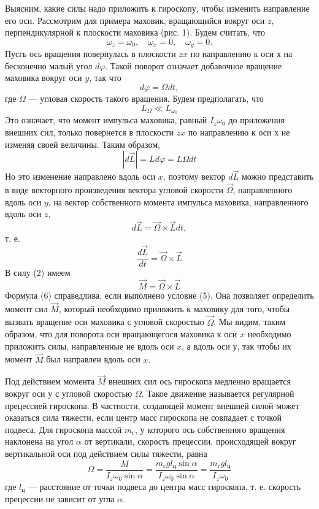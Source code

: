 \documentclass[a4paper,12pt]{article} %
\begin{document}
Выясним, какие силы надо приложить к гироскопу, чтобы изменить направление его оси. Рассмотрим для примера маховик, вращающийся вокруг оси $z$, перпендикулярной к плоскости маховика (рис. 1). Будем считать, что
\[\omega_z = \omega_0, \quad \omega_x = 0, \quad \omega_y = 0.\]
Пусгь ось вращения повернулась в плоскости $zx$ по направлению к оси $х$ на бесконечно малый угол $d\varphi$. Такой поворот означает добавочное вращение маховика вокруг оси $y$, так что
\[d\varphi = \Omega dt,\]
где $\Omega$ — угловая скорость такого вращения. Будем предполагать, что
\begin{equation}
L_\Omega \ll L_{\omega_0}
\end{equation}
Это означает, что момент импульса маховика, равный $I_z\omega_0$ до приложения внешних сил, только повернется в плоскости $zx$ по направлению к оси $х$ не изменяя своей величины. Таким образом,
\[|d\overrightarrow{L}| = Ld\varphi = L\Omega dt\]
Но это изменение направлено вдоль оси $x$, поэтому вектор $d\overrightarrow{L}$ можно представить в виде векторного произведения вектора угловой скорости $\overrightarrow{\Omega}$, направленного вдоль оси $y$, на вектор собственного момента импульса маховика, направленного вдоль оси $z$,
\[d\overrightarrow{L} = \overrightarrow{\Omega} \times \overrightarrow{L}dt,\]
т. е.
\[\frac{d\overrightarrow{L}}{dt} = \overrightarrow{\Omega} \times \overrightarrow{L}\]
В силу (2) имеем
\begin{equation}
\overrightarrow{M} = \overrightarrow{\Omega} \times \overrightarrow{L}
\end{equation}
Формула (6) справедлива, если выполнено условие (5). Она позволяет определить момент сил $\overrightarrow{M}$, который необходимо приложить к маховику для того, чтобы вызвать вращение оси маховика с угловой скоростью $\overrightarrow{\Omega}$. Мы видим, таким образом, что для поворота оси вращающегося маховика к оси $x$ необходимо приложить силы, направленные не вдоль оси $x$, а вдоль оси $у$, так чтобы их момент $\overrightarrow{M}$ был направлен вдоль оси $x$.

Под действием момента $\overrightarrow{M}$ внешних сил ось гироскопа медленно вращается вокруг оси $у$ с угловой скоростью $\Omega$. Такое движение называется регулярной прецессией гироскопа. В частности, создающей момент внешней силой может оказаться сила тяжести, если центр масс гироскопа не совпадает с точкой подвеса. Для гироскопа массой $m_\text{г}$, у которого ось собственного вращения наклонена на угол $\alpha$ от вертикали, скорость прецессии, происходящей вокруг вертикальной оси под действием силы тяжести, равна
\begin{equation}
\Omega = \frac{M}{I_z\omega_0\sin\alpha}= \frac{m_\text{г}gl_\text{ц}\sin\alpha}{I_z\omega_0\sin\alpha} = \frac{m_\text{г}gl_\text{ц}}{I_z\omega_0}
\end{equation}
где $l_\text{ц}$ — расстояние от точки подвеса до центра масс гироскопа, т. е. скорость прецессии не зависит от угла $\alpha$.
\end{document}
